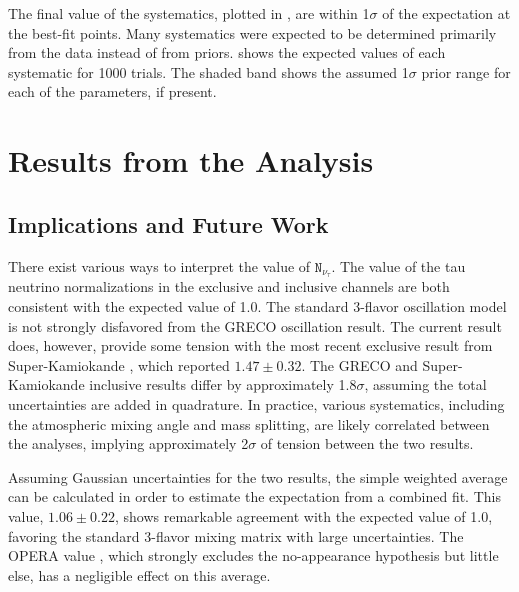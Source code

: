 The final value of the systematics, plotted in , are within 1$\mathtt{\sigma}$ of the expectation at the best-fit points.
Many systematics were expected to be determined primarily from the data instead of from priors. 
 shows the expected values of each systematic for 1000 trials.
The shaded band shows the assumed 1$\mathtt{\sigma}$ prior range for each of the parameters, if present.



\label{section:tau_results}
\section{Results from the Analysis}

\label{subsec:implications}
\subsection{Implications and Future Work}
There exist various ways to interpret the value of $\mathtt{N_{\nu_\tau}}$. 
The value of the tau neutrino normalizations in the exclusive and inclusive channels  are both consistent with the expected value of 1.0.
The standard 3-flavor oscillation model is not strongly disfavored from the GRECO oscillation result.
The current result does, however, provide some tension with the most recent exclusive result from Super-Kamiokande , which reported $\mathtt{1.47\pm0.32}$. 
The GRECO and Super-Kamiokande inclusive results differ by approximately 1.8$\mathtt{\sigma}$, assuming the total uncertainties are added in quadrature.
In practice, various systematics, including the atmospheric mixing angle and mass splitting, are likely correlated between the analyses, implying approximately 2$\mathtt{\sigma}$ of tension between the two results.

Assuming Gaussian uncertainties for the two results, the simple weighted average can be calculated in order to estimate the expectation from a combined fit.
This value, $\mathtt{1.06\pm0.22}$, shows remarkable agreement with the expected value of 1.0, favoring the standard 3-flavor mixing matrix with large uncertainties.
The OPERA value , which strongly excludes the no-appearance hypothesis but little else, has a negligible effect on this average.

